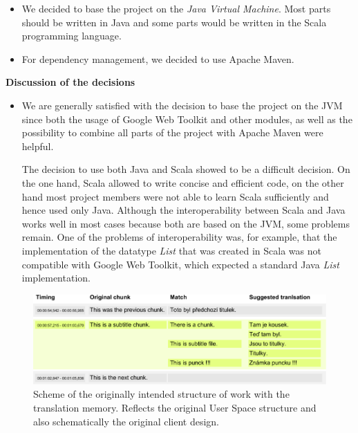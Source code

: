 \begin{itemize}
	\item We decided to base the project on the \emph{Java Virtual Machine}. Most parts should be written in Java and some parts would be written in the Scala programming language.
	\item For dependency management, we decided to use Apache Maven.
\end{itemize}

\noindent\textbf{Discussion of the decisions}

\begin{itemize}
	\item We are generally satisfied with the decision to base the project on the JVM since both the usage of Google Web Toolkit and other modules, as well as the possibility to combine all parts of the project with Apache Maven were helpful. 
	
	The decision to use both Java and Scala showed to be a difficult decision. On the one hand, Scala allowed to write concise and efficient code, on the other hand most project members were not able to learn Scala sufficiently and hence used only Java. Although the interoperability between Scala and Java works well in most cases because both are based on the JVM, some problems remain. One of the problems of interoperability was, for example, that the implementation of the datatype \emph{List} that was created in Scala was not compatible with Google Web Toolkit, which expected a standard Java \emph{List} implementation.
\end{itemize}

\begin{figure}[h]
\begin{center}
\includegraphics{./figures/original_strucutre.pdf}
\end{center}

\caption{Scheme of the originally intended structure of work with the translation memory. Reflects the original User Space structure and also schematically the original client design.}

\end{figure}


